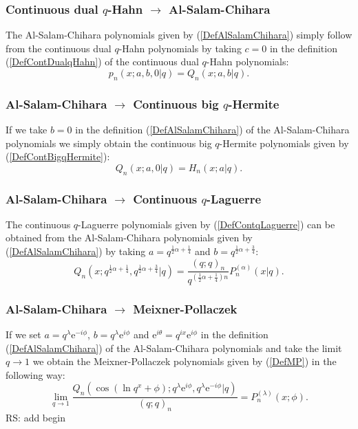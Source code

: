 \documentclass[envcountchap,graybox]{svmono}
\newcounter{rom}
\newcommand{\e}{\textrm{e}}
\begin{document}
\subsubsection*{Continuous dual $q$-Hahn $\rightarrow$ Al-Salam-Chihara}
The Al-Salam-Chihara polynomials given by (\ref{DefAlSalamChihara}) simply follow
from the continuous dual $q$-Hahn polynomials by taking $c=0$ in the
definition (\ref{DefContDualqHahn}) of the continuous dual $q$-Hahn polynomials:
$$p_n(x;a,b,0|q)=Q_n(x;a,b|q).$$

\subsubsection*{Al-Salam-Chihara $\rightarrow$ Continuous big $q$-Hermite}
If we take $b=0$ in the definition (\ref{DefAlSalamChihara}) of the Al-Salam-Chihara
polynomials we simply obtain the continuous big $q$-Hermite polynomials given by
(\ref{DefContBigqHermite}):
\begin{equation}
Q_n(x;a,0|q)=H_n(x;a|q).
\end{equation}

\subsubsection*{Al-Salam-Chihara $\rightarrow$ Continuous $q$-Laguerre}
The continuous $q$-Laguerre polynomials given by (\ref{DefContqLaguerre})
can be obtained from the Al-Salam-Chihara polynomials given by
(\ref{DefAlSalamChihara}) by taking $a=q^{\frac{1}{2}\alpha+\frac{1}{4}}$ and
$b=q^{\frac{1}{2}\alpha+\frac{3}{4}}$:
\begin{equation}
Q_n(x;q^{\frac{1}{2}\alpha+\frac{1}{4}},q^{\frac{1}{2}\alpha+\frac{3}{4}}|q)
=\frac{(q;q)_n}{q^{(\frac{1}{2}\alpha+\frac{1}{4})n}}P_n^{(\alpha)}(x|q).
\end{equation}

\subsubsection*{Al-Salam-Chihara $\rightarrow$ Meixner-Pollaczek}
If we set $a=q^{\lambda}\e^{-i\phi}$, $b=q^{\lambda}\e^{i\phi}$ and
$\e^{i\theta}=q^{ix}\e^{i\phi}$ in the definition (\ref{DefAlSalamChihara}) of
the Al-Salam-Chihara polynomials and take the limit $q\rightarrow 1$ we obtain
the Meixner-Pollaczek polynomials given by (\ref{DefMP}) in the following
way:
\begin{equation}
\lim_{q\rightarrow 1}\frac{Q_n(\cos(\ln q^x+\phi);
q^{\lambda}\e^{i\phi},q^{\lambda}\e^{-i\phi}|q)}{(q;q)_n}=P_n^{(\lambda)}(x;\phi).
\end{equation}
 RS: add begin\label{sec14.7}
\end{document}
